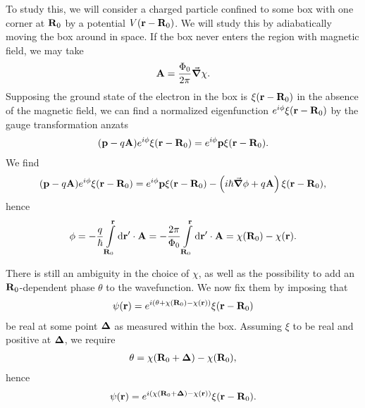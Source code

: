 To study this, we will consider a charged particle confined to some box with one corner at $\vb{R}_{0}$ by a potential $V(\vb{r} - \vb{R}_{0})$. We will study this by adiabatically moving the box around in space. If the box never enters the region with magnetic field, we may take
\begin{align*}
	\vb{A} = \frac{\Phi_{0}}{2\pi}\grad{\chi}.
\end{align*}
Supposing the ground state of the electron in the box is $\xi(\vb{r} - \vb{R}_{0})$ in the absence of the magnetic field, we can find a normalized eigenfunction $e^{i\phi}\xi(\vb{r} - \vb{R}_{0})$ by the gauge transformation anzats
\begin{align*}
	(\vb{p} - q\vb{A})e^{i\phi}\xi(\vb{r} - \vb{R}_{0}) = e^{i\phi}\vb{p}\xi(\vb{r} - \vb{R}_{0}).
\end{align*}
We find
\begin{align*}
	(\vb{p} - q\vb{A})e^{i\phi}\xi(\vb{r} - \vb{R}_{0}) = e^{i\phi}\vb{p}\xi(\vb{r} - \vb{R}_{0}) - \left(i\hbar\grad{\phi} + q\vb{A}\right)\xi(\vb{r} - \vb{R}_{0}),
\end{align*}
hence
\begin{align*}
	\phi = -\frac{q}{\hbar}\int\limits_{\vb{R}_{0}}^{\vb{r}}\dd{\vb{r}\ensuremath{^{\prime}}}\cdot\vb{A} = -\frac{2\pi}{\Phi_{0}}\int\limits_{\vb{R}_{0}}^{\vb{r}}\dd{\vb{r}\ensuremath{^{\prime}}}\cdot\vb{A} = \chi(\vb{R}_{0}) - \chi(\vb{r}).
\end{align*}

There is still an ambiguity in the choice of $\chi$, as well as the possibility to add an $\vb{R}_{0}$-dependent phase $\theta$ to the wavefunction. We now fix them by imposing that
\begin{align*}
	\psi(\vb{r}) = e^{i(\theta + \chi(\vb{R}_{0}) - \chi(\vb{r}))}\xi(\vb{r} - \vb{R}_{0})
\end{align*}
be real at some point $\vb*{\Delta}$ as measured within the box. Assuming $\xi$ to be real and positive at $\vb*{\Delta}$, we require
\begin{align*}
	\theta = \chi(\vb{R}_{0} + \vb*{\Delta}) - \chi(\vb{R}_{0}),
\end{align*}
hence
\begin{align*}
	\psi(\vb{r}) = e^{i(\chi(\vb{R}_{0} + \vb*{\Delta}) - \chi(\vb{r}))}\xi(\vb{r} - \vb{R}_{0}).
\end{align*}

